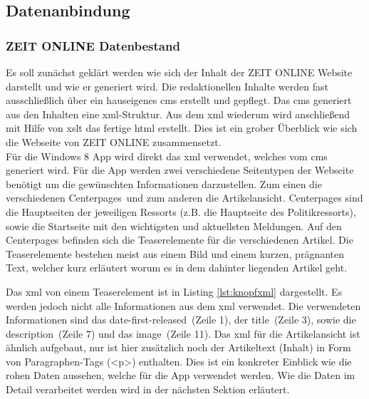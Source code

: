 \documentclass[12pt,a4paper,bibtotoc,abstracton]{scrartcl}
\begin{document}
\subsection{Datenanbindung}
\label{subsec:datenanbindung}

\subsubsection{ZEIT ONLINE Datenbestand}
\label{subsubsec:zondatenbestand}
Es soll zunächst geklärt werden wie sich der Inhalt der ZEIT ONLINE Website darstellt und wie er generiert wird. Die redaktionellen Inhalte werden fast ausschließlich über ein hauseigenes \ac{cms} erstellt und gepflegt. Das \ac{cms} generiert aus den Inhalten eine \ac{xml}-Struktur. Aus dem \ac{xml} wiederum wird anschließend mit Hilfe von \ac{xslt} das fertige \ac{html} erstellt. Dies ist ein grober Überblick wie sich die Webseite von ZEIT ONLINE zusammensetzt.\\
Für die Windows 8 App wird direkt das \ac{xml} verwendet, welches vom \ac{cms} generiert wird. Für die App werden zwei verschiedene Seitentypen der Webseite benötigt um die gewünschten Informationen darzustellen. Zum einen die verschiedenen \glqq Centerpages\grqq\ und zum anderen die Artikelansicht. Centerpages sind die Hauptseiten der jeweiligen Ressorts (z.B. die Hauptseite des Politikressorts), sowie die Startseite mit den wichtigsten und aktuellsten Meldungen. Auf den Centerpages befinden sich die Teaserelemente für die verschiedenen Artikel. Die Teaserelemente bestehen meist aus einem Bild und einem kurzen, prägnanten Text, welcher kurz erläutert worum es in dem dahinter liegenden Artikel geht.\\

\begin{minipage}{\linewidth}

\end{minipage}

Das \ac{xml} von einem Teaserelement ist in Listing \ref{lst:knopfxml} dargestellt. Es werden jedoch nicht alle Informationen aus dem \ac{xml} verwendet. Die verwendeten Informationen sind das \glqq date-first-released\grqq\ (Zeile 1), der \glqq title\grqq\ (Zeile 3), sowie die \glqq description\grqq\ (Zeile 7) und das \glqq image\grqq\ (Zeile 11). Das \ac{xml} für die Artikelansicht ist ähnlich aufgebaut, nur ist hier zusätzlich noch der Artikeltext (Inhalt) in Form von Paragraphen-Tags (<p>) enthalten. Dies ist ein konkreter Einblick wie die rohen Daten aussehen, welche für die App verwendet werden. Wie die Daten im Detail verarbeitet werden wird in der nächsten Sektion erläutert.
\end{document}
